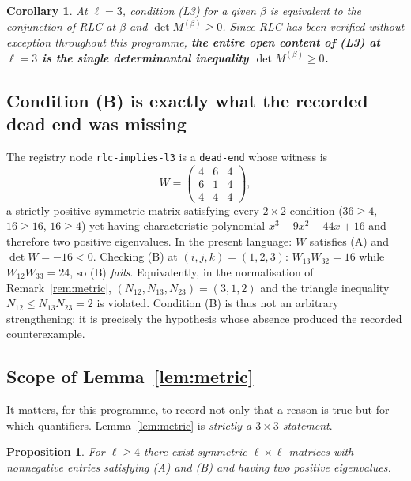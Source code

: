 \documentclass[11pt]{article}
\theoremstyle{plain}
\newtheorem{proposition}[theorem]{Proposition}
\newtheorem{corollary}[theorem]{Corollary}
\theoremstyle{definition}
\begin{document}
\begin{corollary}\label{cor:l3det}
At $\ell=3$, condition \textup{(L3)} for a given $\beta$ is equivalent to the conjunction of
\textup{RLC} at $\beta$ and $\det M^{(\beta)}\ge0$. Since RLC has been verified without exception
throughout this programme, \textbf{the entire open content of \textup{(L3)} at $\ell=3$ is the
single determinantal inequality $\det M^{(\beta)}\ge0$.}
\end{corollary}

\subsection{Condition (B) is exactly what the recorded dead end was missing}

The registry node \texttt{rlc-implies-l3} is a \texttt{dead-end} whose witness is
\[
W=\begin{pmatrix}4&6&4\\6&1&4\\4&4&4\end{pmatrix},
\]
a strictly positive symmetric matrix satisfying every $2\times2$ condition
($36\ge4$, $16\ge16$, $16\ge4$) yet having characteristic polynomial $x^3-9x^2-44x+16$ and
therefore two positive eigenvalues. In the present language: $W$ satisfies (A) and
$\det W=-16<0$. Checking (B) at $(i,j,k)=(1,2,3)$: $W_{13}W_{32}=16$ while $W_{12}W_{33}=24$, so
(B) \emph{fails}. Equivalently, in the normalisation of Remark~\ref{rem:metric},
$(N_{12},N_{13},N_{23})=(3,1,2)$ and the triangle inequality $N_{12}\le N_{13}N_{23}=2$ is violated.
Condition (B) is thus not an arbitrary strengthening: it is precisely the hypothesis whose absence
produced the recorded counterexample.

\subsection{Scope of Lemma~\ref{lem:metric}}\label{sec:scope}

It matters, for this programme, to record not only that a reason is true but for which quantifiers.
Lemma~\ref{lem:metric} is \emph{strictly a $3\times3$ statement}.

\begin{proposition}\label{prop:scope}
For $\ell\ge4$ there exist symmetric $\ell\times\ell$ matrices with nonnegative entries satisfying
\textup{(A)} and \textup{(B)} and having two positive eigenvalues.
\end{proposition}
\end{document}
